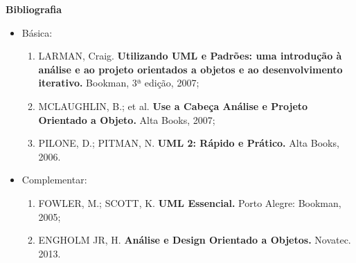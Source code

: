 


\begin{snugshade}\begin{center}\textbf{
    Bibliografia
}\end{center}\end{snugshade}

\begin{itemize} 
  \item Básica:
	\begin{enumerate}
  	\item LARMAN, Craig. \textbf{Utilizando UML e Padrões: uma introdução à análise e ao projeto orientados a objetos e ao desenvolvimento iterativo.} Bookman,  3ª edição, 2007;
	\item MCLAUGHLIN, B.; et al. \textbf{Use a Cabeça Análise e Projeto Orientado a Objeto.} Alta Books, 2007;
	\item PILONE, D.; PITMAN, N. \textbf{UML 2: Rápido e Prático.} Alta Books, 2006.    	\end{enumerate}
  \item Complementar:
	\begin{enumerate} 
  	\item FOWLER, M.; SCOTT, K. \textbf{UML Essencial.} Porto Alegre: Bookman, 2005;
	\item ENGHOLM JR, H. \textbf{Análise e Design Orientado a Objetos.} Novatec. 2013.
	\end{enumerate}
\end{itemize}
